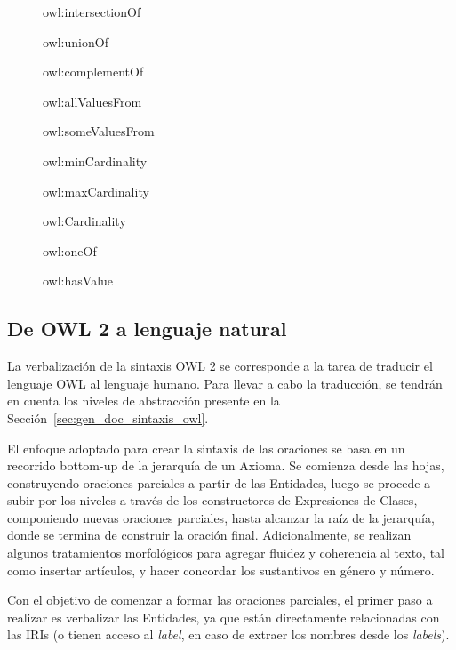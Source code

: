 \begin{figure}
\label{list:constructores_expresiones}
    \begin{itemize}
    \begin{multicols}{2}
        \item owl:intersectionOf
        \item owl:unionOf
        \item owl:complementOf
        \item owl:allValuesFrom
        \item owl:someValuesFrom 
        \item owl:minCardinality
        \item owl:maxCardinality
        \item owl:Cardinality
        \item owl:oneOf
        \item owl:hasValue
        \end{multicols}
    \end{itemize}
\end{figure}

\subsection{De OWL 2 a lenguaje natural}
La verbalización de la sintaxis OWL 2 se corresponde a la tarea de traducir el lenguaje OWL al lenguaje humano. Para llevar a cabo la traducción, se tendrán en cuenta los niveles de abstracción presente en la Sección~\ref{sec:gen_doc_sintaxis_owl}. 

El enfoque adoptado para crear la sintaxis de las oraciones se basa en un recorrido bottom-up de la jerarquía de un Axioma. Se comienza desde las hojas, construyendo oraciones parciales a partir de las Entidades, luego se procede a subir por los niveles a través de los constructores de Expresiones de Clases, componiendo nuevas oraciones parciales, hasta alcanzar la raíz de la jerarquía, donde se termina de construir la oración final. Adicionalmente, se realizan algunos tratamientos morfológicos para agregar fluidez y coherencia al texto, tal como insertar artículos, y hacer concordar los sustantivos en género y número.

Con el objetivo de comenzar a formar las oraciones parciales, el primer paso a realizar es verbalizar las Entidades, ya que están directamente relacionadas con las IRIs (o tienen acceso al \emph{label}, en caso de extraer los nombres desde los \emph{labels}).

